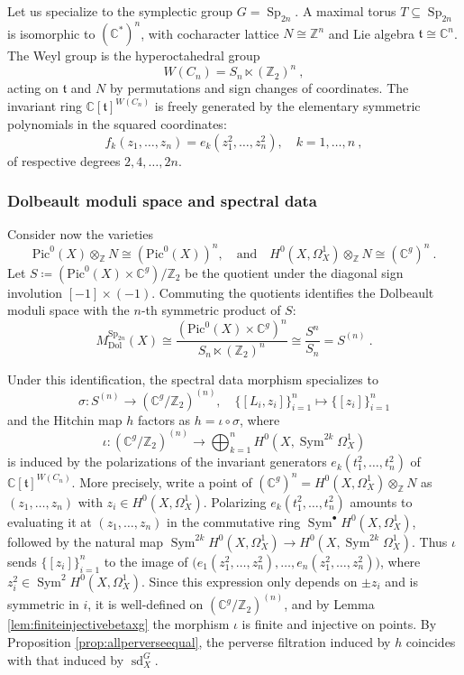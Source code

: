 \documentclass[11pt, a4paper]{amsart}
\theoremstyle{definition}
\theoremstyle{myitemstyle}
\newcommand{\Z}{\mathbb{Z}}
\newcommand{\C}{\mathbb{C}}
\DeclareMathOperator{\Sp}{Sp}
\DeclareMathOperator{\Sym}{Sym}
\newcommand{\Dol}{{\mathrm{Dol}}}
\newcommand{\sd}{{\operatorname{sd}}}
\begin{document}
Let us specialize to the symplectic group $G = \Sp_{2n}$. 
A maximal torus $T \subseteq \Sp_{2n}$ is isomorphic to $(\mathbb{C}^*)^n$, with cocharacter lattice $N \cong \mathbb{Z}^n$ and Lie algebra $\mathfrak{t} \cong \mathbb{C}^n$. The Weyl group is the hyperoctahedral group
\[
W(C_n) = S_n \ltimes (\mathbb{Z}_2)^n\ ,
\]
acting on $\mathfrak{t}$ and $N$ by permutations and sign changes of coordinates. The invariant ring $\mathbb{C}[\mathfrak{t}]^{W(C_n)}$ is freely generated by the elementary symmetric polynomials in the squared coordinates:
\[
f_k(z_1, \dots, z_n) = e_k(z_1^2, \dots, z_n^2), \quad k = 1, \dots, n\ ,
\]
of respective  degrees $2, 4, \dots, 2n$.

\subsubsection{Dolbeault moduli space and spectral data}
Consider now the varieties
\[
\mathrm{Pic}^0(X) \otimes_\mathbb{Z} N \cong (\mathrm{Pic}^0(X))^n, \quad \text{and}\quad H^0(X, \Omega_X^1)\otimes_\Z N \cong (\mathbb{C}^g)^n\ .
\]
Let $S \coloneqq (\mathrm{Pic}^0(X) \times \mathbb{C}^g)/\mathbb{Z}_2$ be the quotient under the diagonal sign involution $[-1] \times (-1)$. Commuting the quotients identifies the Dolbeault moduli space with the $n$-th symmetric product of $S$:
\[
M_{\Dol}^{\Sp_{2n}}(X)\cong 
\frac{(\mathrm{Pic}^0(X) \times \mathbb{C}^g)^n}{S_n \ltimes (\mathbb{Z}_2)^n} \cong 
\frac{S^n}{S_n}= 
S^{(n)}\ .
\]

Under this identification, the spectral data morphism specializes to 
\[
\sigma \colon S^{(n)} \longrightarrow (\mathbb{C}^g / \mathbb{Z}_2)^{(n)}, \quad \{ [L_i, z_i] \}_{i=1}^n \longmapsto \{ [z_i] \}_{i=1}^n
\]
and the Hitchin map $h$ factors as $h=\iota\circ\sigma$, where
\[
    \iota\colon(\C^g/\Z_2)^{(n)}\longrightarrow\bigoplus_{k=1}^nH^0(X,\Sym^{2k}\Omega^1_X)
\]
is induced by the polarizations of the invariant generators $e_k(t_1^2,\dots,t_n^2)$ of $\C[\mathfrak t]^{W(C_n)}$. More precisely, write a point of $(\C^g)^n=H^0(X,\Omega^1_X)\otimes_\Z N$ as $(z_1,\dots,z_n)$ with $z_i\in H^0(X,\Omega^1_X)$. Polarizing $e_k(t_1^2,\dots,t_n^2)$ amounts to evaluating it at $(z_1,\dots,z_n)$ in the commutative ring $\Sym^\bullet H^0(X,\Omega^1_X)$, followed by the natural map $\Sym^{2k}H^0(X,\Omega^1_X)\to H^0(X,\Sym^{2k}\Omega^1_X)$. Thus $\iota$ sends $\{[z_i]\}_{i=1}^n$ to the image of $\big(e_1(z_1^2,\dots,z_n^2),\dots,e_n(z_1^2,\dots,z_n^2)\big)$, where $z_i^2\in\Sym^2H^0(X,\Omega^1_X)$. Since this expression only depends on $\pm z_i$ and is symmetric in $i$, it is well-defined on $(\C^g/\Z_2)^{(n)}$, and by Lemma \ref{lem:finiteinjectivebetaxg} the morphism $\iota$ is finite and injective on points.
By Proposition \ref{prop:allperverseequal}, the perverse filtration induced by $h$ coincides with that induced by $\sd^G_X$.
\end{document}
